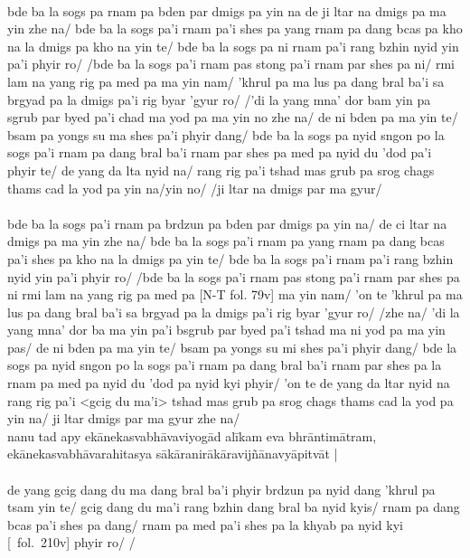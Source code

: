\documentclass[12pt]{article}
\begin{document}
\textbf{\TVA}\\
bde ba la sogs pa rnam pa bden par dmigs pa yin na de ji ltar na dmigs pa ma yin zhe na/ bde ba la sogs pa'i rnam pa'i shes pa yang rnam pa dang bcas pa kho na la dmigs pa kho na yin te/ bde ba la sogs pa ni rnam pa'i rang bzhin nyid yin pa'i phyir ro/ /bde ba la sogs pa'i rnam pas stong pa'i rnam par shes pa ni/ rmi lam na yang rig pa med pa ma yin nam/ 'khrul pa ma lus pa dang bral ba'i sa brgyad pa la dmigs pa'i rig byar 'gyur ro/ /'di la yang mna' dor bam yin pa sgrub par byed pa'i chad ma yod pa ma yin no zhe na/ de ni bden pa ma yin te/ bsam pa yongs su ma shes pa'i phyir dang/ bde ba la sogs pa nyid sngon po la sogs pa'i rnam pa dang bral ba'i rnam par shes pa med pa nyid du 'dod pa'i phyir te/ de yang da lta nyid na/ rang rig pa'i tshad mas grub pa srog chags thams cad la yod pa yin na/yin no/ /ji ltar na dmigs par ma gyur/ \\

\textbf{\TVB}\\
bde ba la sogs pa'i rnam pa brdzun pa bden par dmigs pa yin na/ de ci ltar na dmigs pa ma yin zhe na/ bde ba la sogs pa'i rnam pa yang rnam pa dang bcas pa'i shes pa kho na la dmigs pa yin te/ bde ba la sogs pa'i rnam pa'i rang bzhin nyid yin pa'i phyir ro/ /bde ba la sogs pa'i rnam pas stong pa'i rnam par shes pa ni rmi lam na yang rig pa med pa [N-T fol. 79v] ma yin nam/ 'on te 'khrul pa ma lus pa dang bral ba'i sa brgyad pa la dmigs pa'i rig byar 'gyur ro/ /zhe na/ 'di la yang mna' dor ba ma yin pa'i bsgrub par byed pa'i tshad ma ni yod pa ma yin pas/ de ni bden pa ma yin te/ bsam pa yongs su mi shes pa'i phyir dang/ bde la sogs pa nyid sngon po la sogs pa'i rnam pa dang bral ba'i rnam par shes pa la rnam pa med pa nyid du 'dod pa nyid kyi phyir/ 'on te de yang da ltar nyid na rang rig pa'i <gcig du ma'i> tshad mas grub pa srog chags thams cad la yod pa yin na/ ji ltar dmigs par ma gyur zhe na/\\ 

nanu tad apy ekānekasvabhāvaviyogād alīkam eva bhrāntimātram, ekānekasvabhāvarahitasya sākāranirākāravijñānavyāpitvāt |\\

\textbf{\TVA}\\
de yang gcig dang du ma dang bral ba'i phyir brdzun pa nyid dang 'khrul pa tsam yin te/ gcig dang du ma'i rang bzhin dang bral ba nyid kyis/ rnam pa dang bcas pa'i shes pa dang/ rnam pa med pa'i shes pa la khyab pa nyid kyi [\TVA\ fol.\ 210v] phyir ro/ /\\
\end{document}
